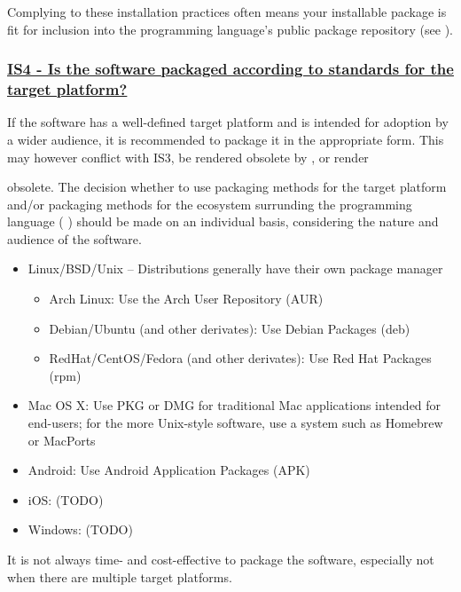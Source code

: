 \documentclass[a4paper,11pt]{article}
\newcommand{\criterion}[2]{\subsubsection*{\underline{#1 - #2}}\label{id:#1}}
\newcommand\CheckTable{%
  \begin{tabular}{ccccc}
    No & Minimal & Adequate & Good & Perfect \\
    0 & 1 & 2 & 3 & 4 \\
    \hline
    $\square$ & $\square$ & $\square$ & $\square$ & $\square$ \\
  \end{tabular}%
}
\newcommand{\refcrit}[1]{%
 \framebox[1.1\width]{\hyperref[id:#1]{#1}}
}
\begin{document}
Complying to these installation practices often means your installable package
is fit for inclusion into the programming language's public package repository
(see \refcrit{AC5}).


\newcommand{\isFourID}{IS4}
\newcommand{\isFourText}{Is the software packaged according to standards for the target platform?}
\criterion{\isFourID}{\isFourText}

If the software has a well-defined target platform and is intended for adoption
by a wider audience, it is recommended to package it in the appropriate form.
This may however conflict with IS3, be rendered obsolete by \refcrit{IS3}, or
render \refcrit{IS3}
obsolete. The decision whether to use packaging methods for the target platform
and/or packaging methods for the ecosystem surrunding the programming language
(\refcrit{IS3}) should be
%
%
%
made on an individual basis, considering the nature and audience of the
software.

\begin{itemize}
    \item Linux/BSD/Unix -- Distributions generally have their own package manager
    \begin{itemize}
        \item Arch Linux: Use the Arch User Repository (AUR)
        \item Debian/Ubuntu (and other derivates): Use Debian Packages (deb)
        \item RedHat/CentOS/Fedora (and other derivates): Use Red Hat Packages (rpm)
    \end{itemize}
    \item Mac OS X: Use PKG or DMG for traditional Mac applications intended for end-users; for the more Unix-style
        software, use a system such as Homebrew or MacPorts
    \item Android: Use Android Application Packages (APK)
    \item iOS: (TODO) 
    \item Windows: (TODO) 
\end{itemize}

It is not always time- and cost-effective to package the software, especially not
when there are multiple target platforms. 
\end{document}

